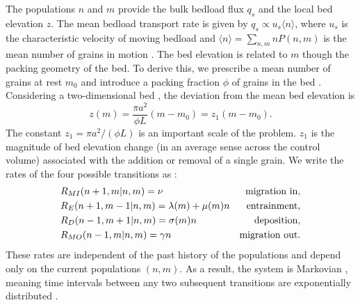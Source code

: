 \documentclass[draft]{agujournal2018}
\begin{document}
The populations $n$ and $m$ provide the bulk bedload flux $q_s$ and the local bed elevation $z$.
The mean bedload transport rate is given by $q_s \propto u_s \langle n \rangle$, where $u_s$ is the characteristic velocity of moving bedload and $\langle n \rangle = 
\sum_{n,m}nP(n,m) $ is the mean number of grains in motion \citep[e.g.][]{Charru2004, Ancey2008, Furbish2012a}.
The bed elevation is related to $m$ though the packing geometry of the bed.
To derive this, we prescribe a mean number of grains at rest $m_0$ and introduce a packing fraction $\phi$ of grains in the bed \citep{Torquato2018}.
Considering a two-dimensional bed \citep[e.g.][]{Einstein1950, Paintal1971}, the deviation from the mean bed elevation is
\begin{equation} z(m) = \frac{\pi a^2}{\phi L}(m-m_0) = z_1(m-m_0). \label{eq:ele}
\end{equation}
The constant $z_1 = \pi a^2/(\phi L)$ is an important scale of the problem. 
$z_1$ is the magnitude of bed elevation change (in an average sense across the control volume) associated with the addition or removal of a single grain.
We write the rates of the four possible transitions as \citep[e.g.][]{Ancey2008}:
\begin{align}
 &R_{MI}(n+1,m|n,m) = \nu & \text{migration in}, \label{eq:rate1}\\
 &R_E(n+1,m-1|n,m) =\lambda(m) + \mu(m) n  & \text{entrainment},  \label{eq:rate2}\\
 &R_D(n-1,m+1|n,m) =\sigma(m) n & \text{deposition},\label{eq:rate3}\\
 &R_{MO}(n-1,m|n,m) =\gamma n & \text{migration out\label{eq:rate4}}.
\end{align}
These rates are independent of the past history of the populations and depend only on the current populations $(n,m)$. 
As a result, the system is Markovian \citep[e.g.][]{Cox1965, VanKampen1992}, meaning time intervals between any two subsequent transitions are exponentially distributed \citep[e.g.][]{Gillespie2007}.
\end{document}
